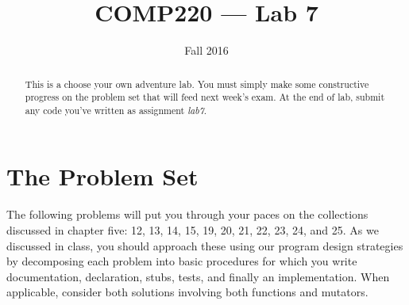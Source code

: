 \documentclass[10pt]{article}
\title{COMP220 --- Lab 7}
\author{ }
\date{Fall 2016}
\begin{document}
\maketitle

\begin{abstract}
This is a choose your own adventure lab.  You must simply make some constructive progress on the problem set that will feed next week's exam. At the end of lab, submit any code you've written as assignment \textit{lab7}.
\end{abstract}

\section{The Problem Set}

The following problems will put you through your paces on the collections discussed in chapter five: 12, 13, 14, 15, 19, 20, 21, 22, 23, 24, and 25.  As we discussed in class, you should approach these using our program design strategies by decomposing each problem into basic procedures for which you write documentation, declaration, stubs, tests, and finally an implementation. When applicable, consider both solutions involving both functions and mutators.
\end{document}
